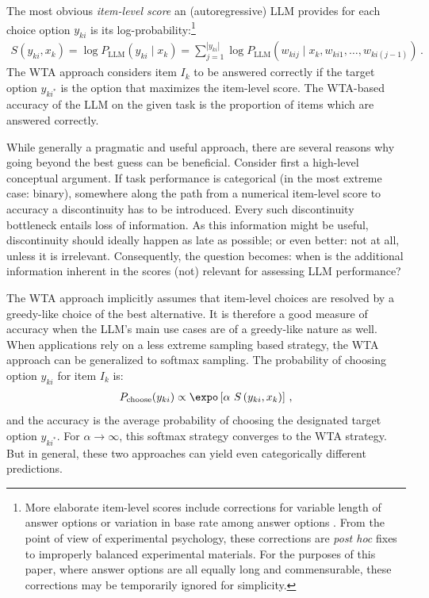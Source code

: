 \documentclass[fleqn]{article}
\begin{document}
The most obvious \emph{item-level score} an (autoregressive) LLM provides for each choice option $y_{ki}$ is its log-probability:\footnote{
  More elaborate item-level scores include corrections for variable length of answer options \citep[e.g.,][]{BrownMann2020:Language-Models} or variation in base rate among answer options \citep[e.g.,][]{HoltzmanWest2021:Surface-Form-Co}.
  From the point of view of experimental psychology, these corrections are \emph{post hoc} fixes to improperly balanced experimental materials.
  For the purposes of this paper, where answer options are all equally long and commensurable, these corrections may be temporarily ignored for simplicity.
}
%
\begin{align*}
  S\left( y_{ki}, x_{k} \right) = \log P_{\text{LLM}} \left(y_{ki} \mid x_{k} \right) =  \sum_{j=1}^{|y_{ki}|} \log P_{\text{LLM}} \left(w_{kij} \mid x_{k}, w_{ki1}, \dots, w_{ki(j-1)} \right)  \,.
\end{align*}
%
The WTA approach considers item $I_{k}$ to be answered correctly if the target option $y_{ki^{*}}$ is the option that maximizes the item-level score.
The WTA-based accuracy of the LLM on the given task is the proportion of items which are answered correctly.

While generally a pragmatic and useful approach, there are several reasons why going beyond the best guess can be beneficial.
Consider first a high-level conceptual argument.
If task performance is categorical (in the most extreme case: binary), somewhere along the path from a numerical item-level score to accuracy a discontinuity has to be introduced.
Every such discontinuity bottleneck entails loss of information.
As this information might be useful, discontinuity should ideally happen as late as possible; or even better: not at all, unless it is irrelevant.
Consequently, the question becomes: when is the additional information inherent in the scores (not) relevant for assessing LLM performance?

The WTA approach implicitly assumes that item-level choices are resolved by a greedy-like choice of the best alternative.
It is therefore a good measure of accuracy when the LLM's main use cases are of a greedy-like nature as well.
When applications rely on a less extreme sampling based strategy, the WTA approach can be generalized to softmax sampling.
The probability of choosing option $y_{ki}$ for item $I_{k}$ is:
%
\begin{align*}
P_{\text{choose}}(y_{ki}) \propto \expo \left [ \alpha \ S \left( y_{ki}, x_{k} \right) \right ]\,,
\end{align*}
%
and the accuracy is the average probability of choosing the designated target option $y_{ki^{*}}$.
For $\alpha \rightarrow \infty$, this softmax strategy converges to the WTA strategy.
But in general, these two approaches can yield even categorically different predictions.
\end{document}
